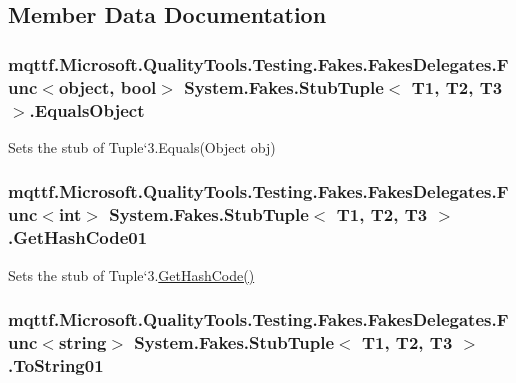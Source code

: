 \subsection{Member Data Documentation}
\hypertarget{class_system_1_1_fakes_1_1_stub_tuple_3_01_t1_00_01_t2_00_01_t3_01_4_a2d0bd144af94dd9579e86663ea07d566}{
\subsubsection[{Equals\-Object}]{\setlength{\rightskip}{0pt plus 5cm}mqttf.\-Microsoft.\-Quality\-Tools.\-Testing.\-Fakes.\-Fakes\-Delegates.\-Func$<$object, bool$>$ System.\-Fakes.\-Stub\-Tuple$<$ T1, T2, T3 $>$.Equals\-Object}}\label{class_system_1_1_fakes_1_1_stub_tuple_3_01_t1_00_01_t2_00_01_t3_01_4_a2d0bd144af94dd9579e86663ea07d566}


Sets the stub of Tuple`3.Equals(\-Object obj)

\hypertarget{class_system_1_1_fakes_1_1_stub_tuple_3_01_t1_00_01_t2_00_01_t3_01_4_af70461073a204d3089802596172bc8de}{
\subsubsection[{Get\-Hash\-Code01}]{\setlength{\rightskip}{0pt plus 5cm}mqttf.\-Microsoft.\-Quality\-Tools.\-Testing.\-Fakes.\-Fakes\-Delegates.\-Func$<$int$>$ System.\-Fakes.\-Stub\-Tuple$<$ T1, T2, T3 $>$.Get\-Hash\-Code01}}\label{class_system_1_1_fakes_1_1_stub_tuple_3_01_t1_00_01_t2_00_01_t3_01_4_af70461073a204d3089802596172bc8de}


Sets the stub of Tuple`3.\hyperlink{class_system_1_1_fakes_1_1_stub_tuple_3_01_t1_00_01_t2_00_01_t3_01_4_a4143fac8a7eb9056474428f11df991aa}{Get\-Hash\-Code()}

\hypertarget{class_system_1_1_fakes_1_1_stub_tuple_3_01_t1_00_01_t2_00_01_t3_01_4_acab2a6e1296be8c19176fd35b5c61ea9}{
\subsubsection[{To\-String01}]{\setlength{\rightskip}{0pt plus 5cm}mqttf.\-Microsoft.\-Quality\-Tools.\-Testing.\-Fakes.\-Fakes\-Delegates.\-Func$<$string$>$ System.\-Fakes.\-Stub\-Tuple$<$ T1, T2, T3 $>$.To\-String01}}\label{class_system_1_1_fakes_1_1_stub_tuple_3_01_t1_00_01_t2_00_01_t3_01_4_acab2a6e1296be8c19176fd35b5c61ea9}



